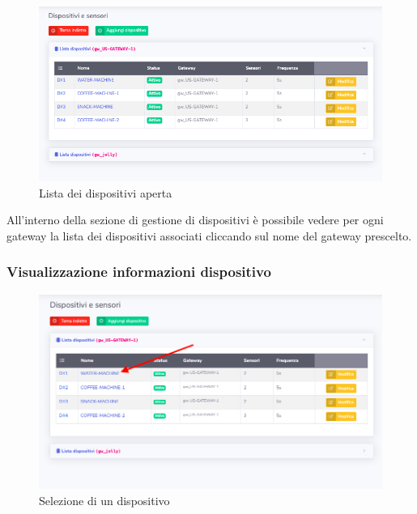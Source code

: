 	\begin{figure}[H]
		\centering
		\includegraphics[scale=0.600]{res/images/admin/listaDispOpen.png}
		\caption{Lista dei dispositivi aperta}
	\end{figure}

		All'interno della sezione di gestione di dispositivi è possibile vedere per ogni gateway la lista dei dispositivi associati cliccando sul nome del gateway prescelto. 

	\subsubsection{Visualizzazione informazioni dispositivo}

		\begin{figure}[H]
		\centering
		\includegraphics[scale=0.600]{res/images/admin/selDetDisp.png}
		\caption{Selezione di un dispositivo}
	\end{figure}


